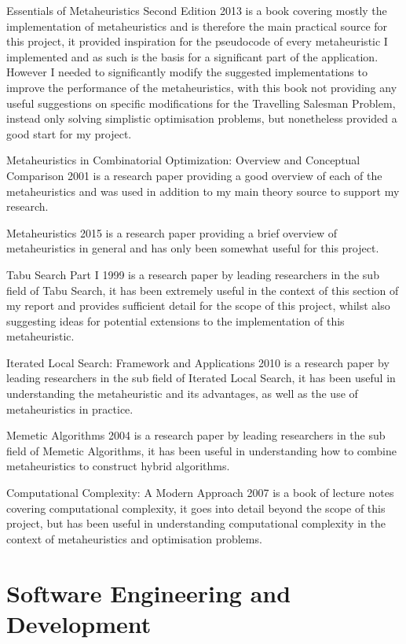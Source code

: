 \documentclass[]{final_report}
\begin{document}
Essentials of Metaheuristics Second Edition 2013\cite{luke:2013} is a book covering mostly the implementation of metaheuristics and is therefore the main practical source for this project, it provided inspiration for the pseudocode of every metaheuristic I implemented and as such is the basis for a significant part of the application. However I needed to significantly modify the suggested implementations to improve the performance of the metaheuristics, with this book not providing any useful suggestions on specific modifications for the Travelling Salesman Problem, instead only solving simplistic optimisation problems, but nonetheless provided a good start for my project.

Metaheuristics in Combinatorial Optimization: Overview and Conceptual Comparison 2001\cite{blum:2001} is a research paper providing a good overview of each of the metaheuristics and was used in addition to my main theory source to support my research.

Metaheuristics 2015\cite{glover:2015} is a research paper providing a brief overview of metaheuristics in general and has only been somewhat useful for this project.

Tabu Search Part I 1999\cite{glover:1999} is a research paper by leading researchers in the sub field of Tabu Search, it has been extremely useful in the context of this section of my report and provides sufficient detail for the scope of this project, whilst also suggesting ideas for potential extensions to the implementation of this metaheuristic.

Iterated Local Search: Framework and Applications 2010\cite{martin:2010} is a research paper by leading researchers in the sub field of Iterated Local Search, it has been useful in understanding the metaheuristic and its advantages, as well as the use of metaheuristics in practice.

Memetic Algorithms 2004\cite{cotta:2004} is a research paper by leading researchers in the sub field of Memetic Algorithms, it has been useful in understanding how to combine metaheuristics to construct hybrid algorithms.

Computational Complexity: A Modern Approach 2007\cite{barak:2007} is a book of lecture notes covering computational complexity, it goes into detail beyond the scope of this project, but has been useful in understanding computational complexity in the context of metaheuristics and optimisation problems.

\chapter*{Software Engineering and Development}
\end{document}
